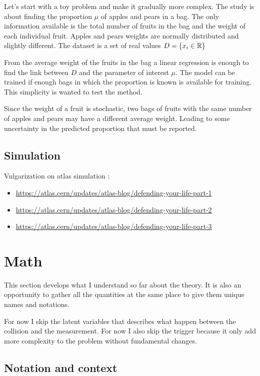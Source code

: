 Let's start with a toy problem and make it gradually more complex.
The study is about finding the proportion $\mu$ of apples and pears in a bag.
The only information available is the total number of fruits in the bag and the weight of each individual fruit.
Apples and pears weights are normally distributed and slightly different.
The dataset is a set of real values $D = \{ x_i \in \mathbb{R} \} $

From the average weight of the fruits in the bag a linear regression is enough to find the link between $D$ and the parameter of interest $\mu$.
The model can be trained if enough bags in which the proportion is known is available for training.
This simplicity is wanted to test the method.

Since the weight of a fruit is stochastic, two bags of fruits with the same number of apples and pears may have a different average weight.
Leading to some uncertainty in the predicted proportion that must be reported.


\subsection{Simulation} %
\label{sub:simulation}


Vulgarization on atlas simulation :
\begin{itemize}
	\item \url{https://atlas.cern/updates/atlas-blog/defending-your-life-part-1}
	\item \url{https://atlas.cern/updates/atlas-blog/defending-your-life-part-2}
	\item \url{https://atlas.cern/updates/atlas-blog/defending-your-life-part-3}
\end{itemize}




\section{Math} %
\label{sec:math}

This section develops what I understand so far about the theory.
It is also an opportunity to gather all the quantities at the same place to give them unique names and notations.

For now I skip the latent variables that describes what happen between the collision and the measurement.
For now I also skip the trigger because it only add more complexity to the problem without fundamental changes.

\subsection{Notation and context} %
\label{sub:notation_and_context}

